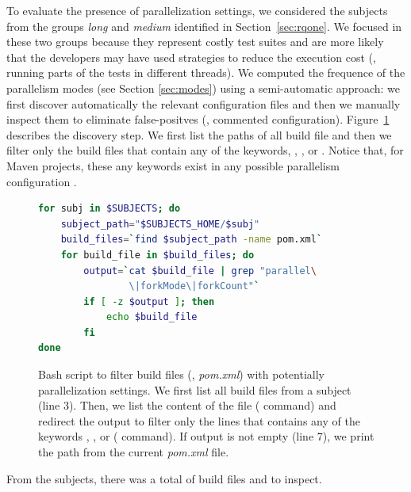 To evaluate the presence of parallelization settings, we considered
the \numSubjsRqTwo{} subjects from the groups \emph{long} and
\emph{medium} identified in Section~\ref{sec:rqone}. We focused in
these two groups because they represent costly test suites and are
more likely that the developers may have used strategies to reduce the
execution cost (\eg, running parts of the tests in different threads).
We computed the frequence of the parallelism modes (see Section
\ref{sec:modes}) using a semi-automatic approach: we first discover
automatically the relevant configuration files and then we manually
inspect them to eliminate false-positves (\eg, commented
configuration).  Figure~\ref{fig:discovery-step} describes the
discovery step. We first list the paths of all build file and then we
filter only the build files that contain any of the keywords,
, , or . Notice
that, for Maven projects, these any keywords exist in any possible
parallelism configuration .

\begin{figure}[h!]
\centering
\scriptsize
{}
\begin{lstlisting}[language=Bash]
for subj in $SUBJECTS; do
    subject_path="$SUBJECTS_HOME/$subj"
    build_files=`find $subject_path -name pom.xml`
    for build_file in $build_files; do
        output=`cat $build_file | grep "parallel\
                \|forkMode\|forkCount"`
        if [ -z $output ]; then
            echo $build_file
        fi
done
\end{lstlisting}
    \caption{\label{fig:discovery-step} Bash script to filter
    build files (\ie, \emph{pom.xml}) with potentially parallelization
    settings. We first list all build files from a subject (line 3).
    Then, we list the content of the file (\CodeIn{cat} command) and
    redirect the output to filter only the lines that contains any of
    the keywords \CodeIn{parallel}, \CodeIn{forkMode}, or
     ( command). If output is not empty
    (line 7), we print the path from the current \emph{pom.xml} file.}
\end{figure}

From the \numSubjsRqTwo{} subjects, there was a total of  build
files and \Fix{Y} to inspect.

\Fix{---------------------}


